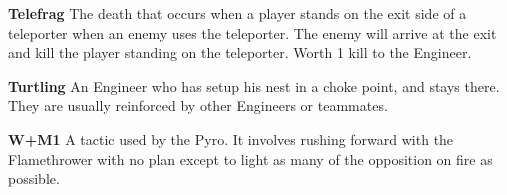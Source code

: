 {\bf Telefrag} The death that occurs when a player stands on the exit side of a teleporter when an enemy uses the teleporter. The enemy will arrive at the exit and kill the player standing on the teleporter. Worth 1 kill to the Engineer. 

{\bf Turtling} An Engineer who has setup his nest in a choke point, and stays there. They are usually reinforced by other Engineers or teammates.

{\bf W+M1} A tactic used by the Pyro. It involves rushing forward with the Flamethrower with no plan except to light as many of the opposition on fire as possible.